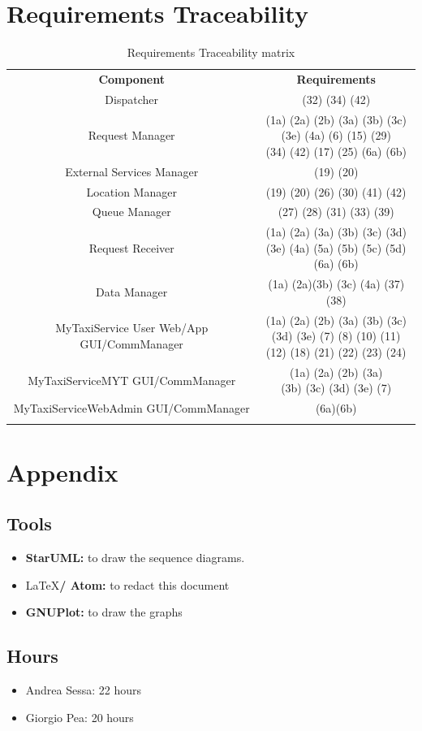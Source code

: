 \documentclass[11pt,titlepage]{article} %
\begin{document}
\section{Requirements Traceability}
	\begin{table}[h]
		\centering
		\begin{tabular}{|| c || c ||}
			\hhline{|t:==:t|}
  			\textbf{Component} & \textbf{Requirements} \\
			\hhline{|:=|=:|}
 			Dispatcher & (32)  (34) (42)\\
			\hhline{|:-|-:|}
 			Request Manager &  \pbox{10cm}{(1a) (2a) (2b) (3a) (3b) (3c)\\ (3e) (4a) (6) (15) (29) \\ (34) (42) (17) (25) (6a) (6b)} \\
			\hhline{|:-|-:|}
 			External Services Manager &  (19) (20)\\
			\hhline{|:-|-:|}
 			Location Manager & (19) (20) (26) (30) (41) (42)\\
			\hhline{|:-|-:|}
 			Queue Manager &  (27) (28) (31) (33) (39)\\
			\hhline{|:-|-:|}
 			Request Receiver &\pbox{10cm}{(1a) (2a) (3a) (3b) (3c) (3d)\\ (3e) (4a) (5a) (5b) (5c) (5d)\\(6a) (6b)}\\
			\hhline{|:-|-:|}
 			Data Manager &  (1a) (2a)(3b) (3c) (4a) (37) (38) \\
			\hhline{|:-|-:|}
 			MyTaxiService User Web/App GUI/CommManager & \pbox{10cm}{(1a) (2a) (2b) (3a) (3b) (3c) \\ (3d) (3e) (7) (8) (10) (11) \\ (12) (18) (21) (22) (23) (24)} \\
			\hhline{|:-|-:|}
 			MyTaxiServiceMYT GUI/CommManager &  \pbox{10cm}{(1a) (2a) (2b) (3a) \\ (3b) (3c) (3d) (3e) (7)}\\
			\hhline{|:-|-:|}
			MyTaxiServiceWebAdmin GUI/CommManager & (6a)(6b) \\ 
			\hhline{|b:==:b|}
		\end{tabular}
		\caption{Requirements Traceability matrix}
\end{table}

\newpage
\section{Appendix}
	\subsection{Tools}
		\begin{itemize}
			\item \textbf{StarUML:} to draw the sequence diagrams.
			\item \LaTeX \textbf{/ Atom:} to redact this document
			\item \textbf{GNUPlot:} to draw the graphs
		\end{itemize}

	\subsection{Hours}
		\begin{itemize}
			\item Andrea Sessa: 22 hours
			\item Giorgio Pea: 20 hours
		\end{itemize}
\end{document}
